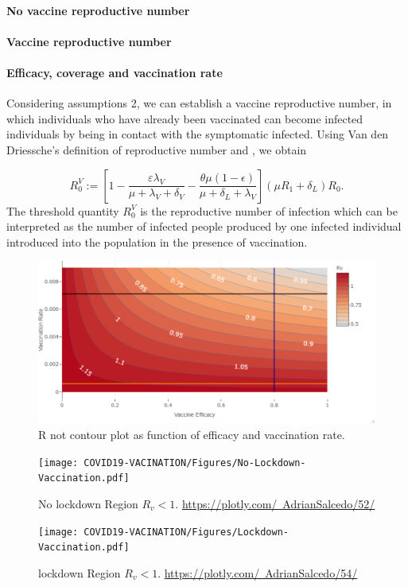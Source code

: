 \paragraph{No  vaccine reproductive number}
\paragraph{Vaccine reproductive number}
\paragraph{Efficacy, coverage and vaccination rate}

%
%
Considering assumptions 2, we can establish a vaccine reproductive number,
in which individuals who have already been vaccinated
can become infected individuals by being in contact with the
symptomatic infected. Using Van den Driessche’s \cite{VandenDriessche2017a}
definition of reproductive number and \cite{Alexander2004}, we obtain

\begin{equation*}
 R_{0}^V := \left[ 1-\frac{\varepsilon \lambda_V}
 {\mu+\lambda_V+\delta_V}
 -\frac{\theta\mu(1-\epsilon)}{\mu+\delta_L+\lambda_V}\right]
 (\mu R_1+\delta_L)R_0.
\end{equation*}
%
The threshold quantity $R_0^V$ is the reproductive number of infection
which can be interpreted as the number of infected people produced
by one infected individual introduced into the population in the
presence of vaccination.

\begin{figure}[tbh]
    \centering
      \includegraphics[scale=0.5, keepaspectratio]{Figures/Rv_contour}
    \caption{R not contour plot as function of efficacy and vaccination rate.}
    \label{fig:rvcontour1}
\end{figure}
\begin{figure}[tbh]
    \centering
      \texttt{[image: COVID19-VACINATION/Figures/No-Lockdown-Vaccination.pdf]}
    \caption{No lockdown Region $R_v<1$.
    \href{https://plotly.com/~AdrianSalcedo/52/}{%
		https://plotly.com/~AdrianSalcedo/52/}
    }
    \label{fig:Nolockdown}
\end{figure}

\begin{figure}[tbh]
    \centering
      \texttt{[image: COVID19-VACINATION/Figures/Lockdown-Vaccination.pdf]}
    \caption{lockdown Region $R_v<1$.
        \href{https://plotly.com/~AdrianSalcedo/54/}{%
		https://plotly.com/~AdrianSalcedo/54/}
    }
    \label{fig:Lockdown}
\end{figure}